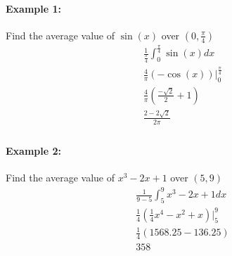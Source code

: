\documentclass[../revisedmain.tex]{subfiles}
\begin{document}
	\paragraph{Example 1:} Find the average value of $\sin(x)$ over $(0,\frac{\pi}{4})$
	\begin{gather*}
	\frac{1}{\frac{\pi}{4}}\int_{0}^{\frac{\pi}{4}}\sin(x)dx\\
	\frac{4}{\pi}(-\cos(x))\Big|_{0}^{\frac{\pi}{4}}\\
	\frac{4}{\pi}\left(\frac{-\sqrt{2}}{2}+1\right)\\
	\frac{2-2\sqrt{2}}{2\pi}\\
	\end{gather*}
	\paragraph{Example 2:} Find the average value of $x^3-2x+1$ over $(5,9)$
	\begin{gather*}
		\frac{1}{9-5}\int_{5}^{9}x^3-2x+1dx\\
		\frac{1}{4}\left(\frac{1}{4}x^4-x^2+x\right)\Big|_{5}^{9}\\
		\frac{1}{4}(1568.25-136.25)\\
		358
	\end{gather*}
\end{document}

